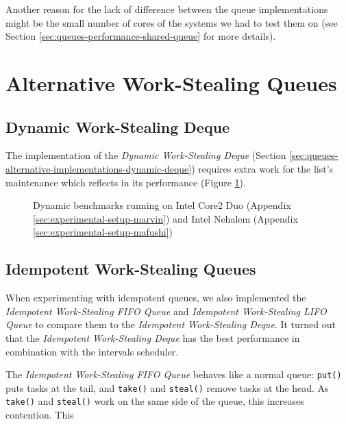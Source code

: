 Another reason for the lack of difference between the queue
implementations might be the small number of cores of the systems we
had to test them on (see Section
\ref{sec:queues-performance-shared-queue} for more details).


\section{Alternative Work-Stealing Queues}
\label{sec:queues-performance-alternative}

\subsection{Dynamic Work-Stealing Deque}
\label{sec:queues-performance-alternative-dynamic}

The implementation of the \emph{Dynamic Work-Stealing Deque} (Section
\ref{sec:queues-alternative-implementations-dynamic-deque}) requires
extra work for the list's maintenance which reflects in its
performance (Figure \ref{fig:queues-performance-dynamic}).

\begin{figure}[!htb]
  \centering
  \caption{Dynamic benchmarks running on Intel Core2 Duo (Appendix
    \ref{sec:experimental-setup-marvin}) and Intel Nehalem (Appendix
    \ref{sec:experimental-setup-mafushi})}
  \label{fig:queues-performance-dynamic}
\end{figure}

\subsection{Idempotent Work-Stealing Queues}
\label{sec:performance-alternative-idempotent}

When experimenting with idempotent queues, we also implemented the
\emph{Idempotent Work-Stealing FIFO Queue} and \emph{Idempotent
  Work-Stealing LIFO Queue} to compare them to the \emph{Idempotent
  Work-Stealing Deque}. It turned out that the \emph{Idempotent
  Work-Stealing Deque} has the best performance in combination with
the intervals scheduler.

The \emph{Idempotent Work-Stealing FIFO Queue} behaves like a normal
queue: \lstinline!put()! puts tasks at the tail, and
\lstinline!take()!  and \lstinline!steal()! remove tasks at the
head. As \lstinline!take()! and \lstinline!steal()! work on the same
side of the queue, this increases contention. This

